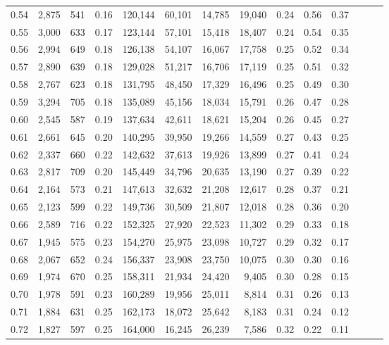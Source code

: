 \begin{tabular}{rrrrrrrrrrrrrr}
0.54 &  2,875 &  541 &  0.16 &  120,144 &   60,101 &  14,785 &  19,040 &  0.24 &  0.56 &      0.37 \\
0.55 &  3,000 &  633 &  0.17 &  123,144 &   57,101 &  15,418 &  18,407 &  0.24 &  0.54 &      0.35 \\
0.56 &  2,994 &  649 &  0.18 &  126,138 &   54,107 &  16,067 &  17,758 &  0.25 &  0.52 &      0.34 \\
0.57 &  2,890 &  639 &  0.18 &  129,028 &   51,217 &  16,706 &  17,119 &  0.25 &  0.51 &      0.32 \\
0.58 &  2,767 &  623 &  0.18 &  131,795 &   48,450 &  17,329 &  16,496 &  0.25 &  0.49 &      0.30 \\
0.59 &  3,294 &  705 &  0.18 &  135,089 &   45,156 &  18,034 &  15,791 &  0.26 &  0.47 &      0.28 \\
0.60 &  2,545 &  587 &  0.19 &  137,634 &   42,611 &  18,621 &  15,204 &  0.26 &  0.45 &      0.27 \\
0.61 &  2,661 &  645 &  0.20 &  140,295 &   39,950 &  19,266 &  14,559 &  0.27 &  0.43 &      0.25 \\
0.62 &  2,337 &  660 &  0.22 &  142,632 &   37,613 &  19,926 &  13,899 &  0.27 &  0.41 &      0.24 \\
0.63 &  2,817 &  709 &  0.20 &  145,449 &   34,796 &  20,635 &  13,190 &  0.27 &  0.39 &      0.22 \\
0.64 &  2,164 &  573 &  0.21 &  147,613 &   32,632 &  21,208 &  12,617 &  0.28 &  0.37 &      0.21 \\
0.65 &  2,123 &  599 &  0.22 &  149,736 &   30,509 &  21,807 &  12,018 &  0.28 &  0.36 &      0.20 \\
0.66 &  2,589 &  716 &  0.22 &  152,325 &   27,920 &  22,523 &  11,302 &  0.29 &  0.33 &      0.18 \\
0.67 &  1,945 &  575 &  0.23 &  154,270 &   25,975 &  23,098 &  10,727 &  0.29 &  0.32 &      0.17 \\
0.68 &  2,067 &  652 &  0.24 &  156,337 &   23,908 &  23,750 &  10,075 &  0.30 &  0.30 &      0.16 \\
0.69 &  1,974 &  670 &  0.25 &  158,311 &   21,934 &  24,420 &   9,405 &  0.30 &  0.28 &      0.15 \\
0.70 &  1,978 &  591 &  0.23 &  160,289 &   19,956 &  25,011 &   8,814 &  0.31 &  0.26 &      0.13 \\
0.71 &  1,884 &  631 &  0.25 &  162,173 &   18,072 &  25,642 &   8,183 &  0.31 &  0.24 &      0.12 \\
0.72 &  1,827 &  597 &  0.25 &  164,000 &   16,245 &  26,239 &   7,586 &  0.32 &  0.22 &      0.11 \\

\end{tabular}
